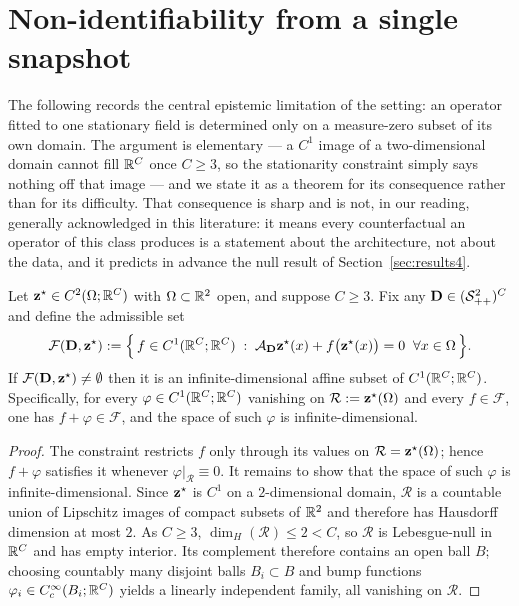 \section{Non-identifiability from a single snapshot}
\label{app:identifiability}

The following records the central epistemic limitation of the setting: an
operator fitted to one stationary field is determined only on a measure-zero
subset of its own domain. The argument is elementary --- a $C^1$ image of a
two-dimensional domain cannot fill $\mathbb{R}^C$ once $C\ge3$, so the stationarity
constraint simply says nothing off that image --- and we state it as a theorem
for its consequence rather than for its difficulty. That consequence is sharp and
is not, in our reading, generally acknowledged in this literature: it means every
counterfactual an operator of this class produces is a statement about the
architecture, not about the data, and it predicts in advance the null result of
Section~\ref{sec:results4}.

\begin{theorem}
\label{thm:identifiability}
Let $\mathbf{z}^\star \in C^2(\Omega;\mathbb{R}^C)$ with $\Omega\subset\mathbb{R}^2$ open, and suppose
$C \ge 3$. Fix any $\mathbf{D}\in(\mathcal{S}_{++}^2)^C$ and define the admissible set
\begin{equation}
\mathcal{F}(\mathbf{D},\mathbf{z}^\star) := \Big\{\, f\in C^1(\mathbb{R}^C;\mathbb{R}^C) \;:\;
  \mathcal{A}_{\mathbf{D}}\mathbf{z}^\star(x) + f\big(\mathbf{z}^\star(x)\big)=0
  \;\;\forall x\in\Omega \,\Big\}.
\end{equation}
If $\mathcal{F}(\mathbf{D},\mathbf{z}^\star)\ne\emptyset$ then it is an infinite-dimensional
affine subset of $C^1(\mathbb{R}^C;\mathbb{R}^C)$. Specifically, for every
$\varphi\in C^1(\mathbb{R}^C;\mathbb{R}^C)$ vanishing on $\mathcal{R}:=\mathbf{z}^\star(\Omega)$ and
every $f\in\mathcal{F}$, one has $f+\varphi\in\mathcal{F}$, and the space of such
$\varphi$ is infinite-dimensional.
\end{theorem}

\begin{proof}
The constraint restricts $f$ only through its values on
$\mathcal{R}=\mathbf{z}^\star(\Omega)$; hence $f+\varphi$ satisfies it whenever
$\varphi|_{\mathcal{R}}\equiv0$. It remains to show that the space of such
$\varphi$ is infinite-dimensional. Since $\mathbf{z}^\star$ is $C^1$ on a
$2$-dimensional domain, $\mathcal{R}$ is a countable union of Lipschitz images of
compact subsets of $\mathbb{R}^2$ and therefore has Hausdorff dimension at most $2$. As
$C\ge3$, $\dim_H(\mathcal{R}) \le 2 < C$, so $\mathcal{R}$ is Lebesgue-null in
$\mathbb{R}^C$ and has empty interior. Its complement therefore contains an open ball
$B$; choosing countably many disjoint balls $B_i\subset B$ and bump functions
$\varphi_i\in C_c^\infty(B_i;\mathbb{R}^C)$ yields a linearly independent family, all
vanishing on $\mathcal{R}$.
\end{proof}

